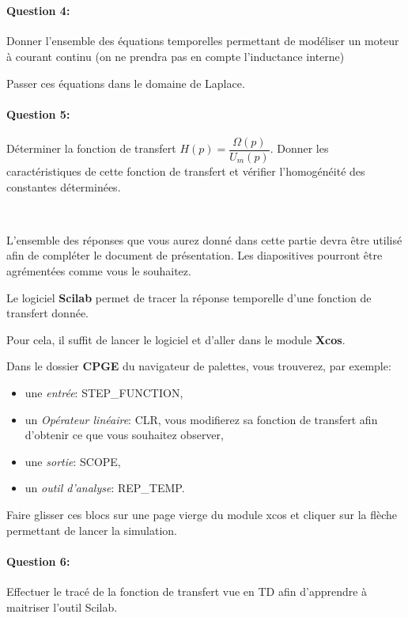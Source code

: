 ~\

\paragraph{Question 4:} Donner l'ensemble des équations temporelles permettant de modéliser un moteur à courant continu (on ne prendra pas en compte l'inductance interne)

Passer ces équations dans le domaine de Laplace.

\paragraph{Question 5:} Déterminer la fonction de transfert $H(p)=\dfrac{\Omega(p)}{U_m(p)}$. Donner les caractéristiques de cette fonction de transfert et vérifier l'homogénéité des constantes déterminées.

~\

L'ensemble des réponses que vous aurez donné dans cette partie devra être utilisé afin de compléter le document de présentation. Les diapositives pourront être agrémentées comme vous le souhaitez.

\ifdef{\public}{\cleardoublepage}{\newpage}


Le logiciel \textbf{Scilab} permet de tracer la réponse temporelle d'une fonction de transfert donnée.

Pour cela, il suffit de lancer le logiciel et d'aller dans le module \textbf{Xcos}.

Dans le dossier \textbf{CPGE} du navigateur de palettes, vous trouverez, par exemple:
\begin{itemize}
 \item une \textit{entrée}: STEP\_FUNCTION,
 \item un \textit{Opérateur linéaire}: CLR, vous modifierez sa fonction de transfert afin d'obtenir ce que vous souhaitez observer,
 \item une \textit{sortie}: SCOPE,
 \item un \textit{outil d'analyse}: REP\_TEMP.
\end{itemize}

Faire glisser ces blocs sur une page vierge du module xcos et cliquer sur la flèche permettant de lancer la simulation.

\paragraph{Question 6:} Effectuer le tracé de la fonction de transfert vue en TD afin d'apprendre à maitriser l'outil Scilab.

